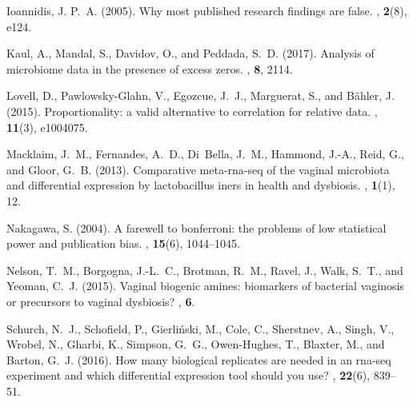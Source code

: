 \documentclass{bioinfo}
\begin{document}
\begin{thebibliography}{}
Ioannidis, J. P.~A. (2005).
\newblock Why most published research findings are false.
, {\bf 2}(8), e124.

Kaul, A., Mandal, S., Davidov, O., and Peddada, S.~D. (2017).
\newblock Analysis of microbiome data in the presence of excess zeros.
, {\bf 8}, 2114.

Lovell, D., Pawlowsky-Glahn, V., Egozcue, J.~J., Marguerat, S., and B{\"a}hler,
  J. (2015).
\newblock Proportionality: a valid alternative to correlation for relative
  data.
, {\bf 11}(3), e1004075.

Macklaim, J.~M., Fernandes, A.~D., Di~Bella, J.~M., Hammond, J.-A., Reid, G.,
  and Gloor, G.~B. (2013).
\newblock Comparative meta-rna-seq of the vaginal microbiota and differential
  expression by lactobacillus iners in health and dysbiosis.
, {\bf 1}(1), 12.

Nakagawa, S. (2004).
\newblock A farewell to bonferroni: the problems of low statistical power and
  publication bias.
, {\bf 15}(6), 1044--1045.

Nelson, T.~M., Borgogna, J.-L.~C., Brotman, R.~M., Ravel, J., Walk, S.~T., and
  Yeoman, C.~J. (2015).
\newblock Vaginal biogenic amines: biomarkers of bacterial vaginosis or
  precursors to vaginal dysbiosis?
, {\bf 6}.

Schurch, N.~J., Schofield, P., Gierli{\'n}ski, M., Cole, C., Sherstnev, A.,
  Singh, V., Wrobel, N., Gharbi, K., Simpson, G.~G., Owen-Hughes, T., Blaxter,
  M., and Barton, G.~J. (2016).
\newblock How many biological replicates are needed in an rna-seq experiment
  and which differential expression tool should you use?
, {\bf 22}(6), 839--51.


\end{thebibliography}
\end{document}
